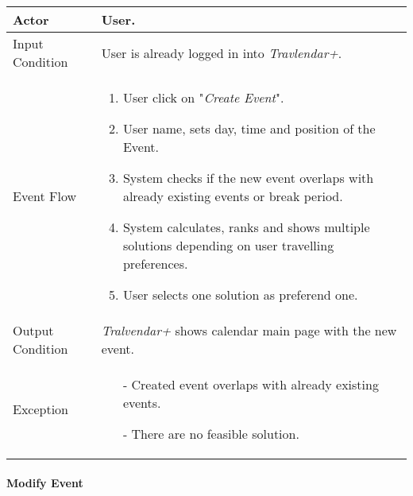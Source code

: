 		\begin{tabular}{| l | p{} | }
			\hline
			\hline
			Actor	&		User. \\
			\hline
			Input Condition		&		User is already logged in into \textit{Travlendar+}. \\
			\hline
			Event Flow		&		\begin{enumerate}
												\item User click on "\textit{Create Event}".
												\item User name, sets day, time and position of the Event.
												\item System checks if the new event overlaps with already existing events or break period.
												\item	 System calculates, ranks and shows multiple solutions depending on user travelling preferences.
												\item User selects one solution as preferend one.
											\end{enumerate} \\
			\hline
			Output Condition		&		\textit{Tralvendar+} shows calendar main page with the new event. \\
			\hline		
			Exception		&		\begin{itemize}
											\item[-] Created event overlaps with already existing events.
											\item[-] There are no feasible solution.
										\end{itemize} \\
			\hline
			\hline
		\end{tabular}



	\paragraph{Modify Event}
	
